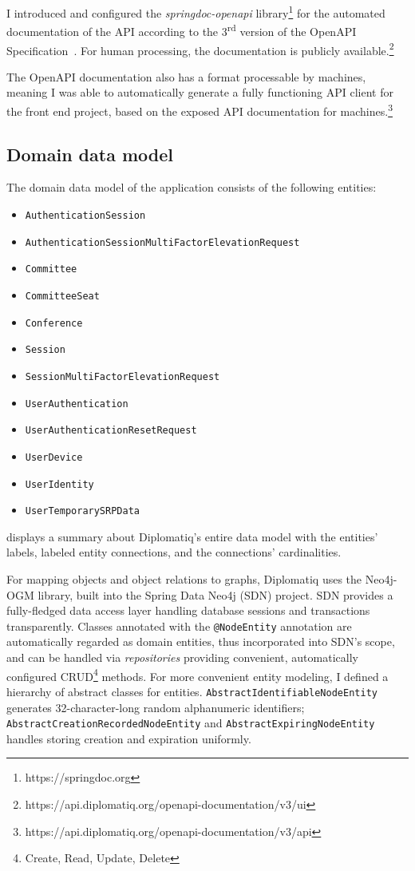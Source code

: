 I introduced and configured the \emph{springdoc-openapi} library\footnote{https://springdoc.org} for the automated documentation of the API according to the 3\textsuperscript{rd} version of the OpenAPI Specification~\cite{openapi-spec}. For human processing, the documentation is publicly available.\footnote{https://api.diplomatiq.org/openapi-documentation/v3/ui}

The OpenAPI documentation also has a format processable by machines, meaning I was able to automatically generate a fully functioning API client for the front end project, based on the exposed API documentation for machines.\footnote{https://api.diplomatiq.org/openapi-documentation/v3/api}

\subsection{Domain data model}

The domain data model of the application consists of the following entities:

\begin{itemize}
\item \lstinline{AuthenticationSession}
\item \lstinline{AuthenticationSessionMultiFactorElevationRequest}
\item \lstinline{Committee}
\item \lstinline{CommitteeSeat}
\item \lstinline{Conference}
\item \lstinline{Session}
\item \lstinline{SessionMultiFactorElevationRequest}
\item \lstinline{UserAuthentication}
\item \lstinline{UserAuthenticationResetRequest}
\item \lstinline{UserDevice}
\item \lstinline{UserIdentity}
\item \lstinline{UserTemporarySRPData}
\end{itemize}

 displays a summary about Diplomatiq's entire data model with the entities' labels, labeled entity connections, and the connections' cardinalities.

For mapping objects and object relations to graphs, Diplomatiq uses the Neo4j-OGM library, built into the Spring Data Neo4j (SDN) project. SDN provides a fully-fledged data access layer handling database sessions and transactions transparently. Classes annotated with the \lstinline{@NodeEntity} annotation are automatically regarded as domain entities, thus incorporated into SDN's scope, and can be handled via \emph{repositories} providing convenient, automatically configured CRUD\footnote{Create, Read, Update, Delete} methods. For more convenient entity modeling, I defined a hierarchy of abstract classes for entities. \lstinline{AbstractIdentifiableNodeEntity} generates 32-character-long random alphanumeric identifiers; \lstinline{AbstractCreationRecordedNodeEntity} and \lstinline{AbstractExpiringNodeEntity} handles storing creation and expiration uniformly.

